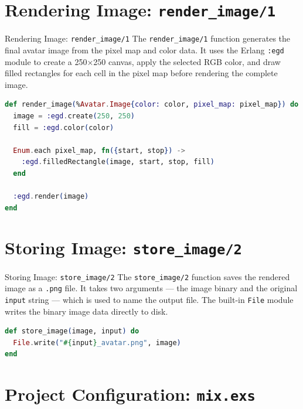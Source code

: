 \documentclass[aspectratio=169, table]{beamer}
\begin{document}
\section{Rendering Image: \texttt{render\_image/1}}


\begin{frame}[fragile]{Rendering Image: \texttt{render\_image/1}}
\vspace{20pt}
\small
The \texttt{render\_image/1} function generates the final avatar image from the pixel map and color data.  
It uses the Erlang \texttt{:egd} module to create a 250×250 canvas, apply the selected RGB color,  
and draw filled rectangles for each cell in the pixel map before rendering the complete image.

\begin{lstlisting}[language=Elixir, basicstyle=\ttfamily\scriptsize]
def render_image(%Avatar.Image{color: color, pixel_map: pixel_map}) do
  image = :egd.create(250, 250)
  fill = :egd.color(color)

  Enum.each pixel_map, fn({start, stop}) ->
    :egd.filledRectangle(image, start, stop, fill)
  end

  :egd.render(image)
end
\end{lstlisting}
\end{frame}

\section{Storing Image: \texttt{store\_image/2}}

\begin{frame}[fragile]{Storing Image: \texttt{store\_image/2}}
\vspace{20pt}
\small
The \texttt{store\_image/2} function saves the rendered image as a \texttt{.png} file.  
It takes two arguments — the image binary and the original \texttt{input} string — which is used to name the output file.  
The built-in \texttt{File} module writes the binary image data directly to disk.

\begin{lstlisting}[language=Elixir, basicstyle=\ttfamily\scriptsize]
def store_image(image, input) do
  File.write("#{input}_avatar.png", image)
end
\end{lstlisting}
\end{frame}

\section{Project Configuration: \texttt{mix.exs}}
\end{document}
